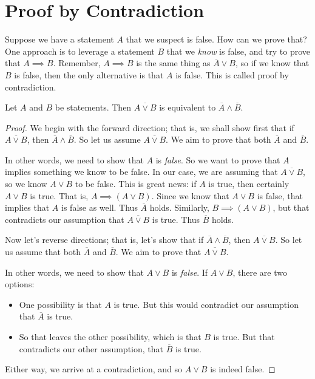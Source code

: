 \documentclass[11pt,dvipsnames]{book}
\numberwithin{figure}{section} %
\numberwithin{table}{section} %
\begin{document}
\section{Proof by Contradiction}

Suppose we have a statement $A$ that we suspect is false.
How can we prove that?
One approach is to leverage a statement $B$ that we \emph{know} is false, and try to prove that $A \implies B$.
Remember, $A \implies B$ is the same thing as $\overline{A} \vee B$,
so if we know that $B$ is false, then the only alternative is that $A$ is false.
This is called proof by contradiction.

\begin{theorem}
Let $A$ and $B$ be statements.
Then $\overline{A \vee B}$ is equivalent to $\overline{A} \wedge \overline{B}$.
\end{theorem}

\begin{proof}
We begin with the forward direction;
that is, we shall show first that if $\overline{A \vee B}$, then $\overline{A} \wedge \overline{B}$.
So let us assume $\overline{A \vee B}$.
We aim to prove that both $\overline{A}$ and $\overline{B}$.

In other words, we need to show that $A$ is \emph{false}.
So we want to prove that $A$ implies something we know to be false.
In our case, we are assuming that $\overline{A \vee B}$, so we know $A \vee B$ to be false.
This is great news: if $A$ is true, then certainly $A \vee B$ is true.
That is, $A \implies (A \vee B)$.
Since we know that $A \vee B$ is false, that implies that $A$ is false as well.
Thus $\overline{A}$ holds.
Similarly, $B \implies (A \vee B)$, but that contradicts our assumption that $\overline{A \vee B}$ is true.
Thus $\overline{B}$ holds.

Now let's reverse directions;
that is, let's show that if $\overline{A} \wedge \overline{B}$, then $\overline{A \vee B}$.
So let us assume that both $\overline{A}$ and $\overline{B}$.
We aim to prove that $\overline{A \vee B}$.

In other words, we need to show that $A \vee B$ is \emph{false}.
If $A \vee B$, there are two options:
\begin{itemize}
    \item One possibility is that $A$ is true. But this would contradict our assumption that $\overline{A}$ is true.
    \item So that leaves the other possibility, which is that $B$ is true. But that contradicts our other assumption, that $\overline{B}$ is true.
\end{itemize}
Either way, we arrive at a contradiction, and so $A\vee B$ is indeed false.
\end{proof}
\end{document}

